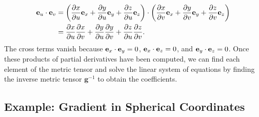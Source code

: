 \begin{align}
  \evec_u \cdot \evec_v &= \left( \dho{x}{u} \evec_x + \dho{y}{u} \evec_y + \dho{z}{u} \evec_z \right) \cdot \left( \dho{x}{v} \evec_x + \dho{y}{v} \evec_y + \dho{z}{v} \evec_z \right) \nonumber \\
  &= \dho{x}{u} \dho{x}{v} + \dho{y}{u} \dho{y}{v} + \dho{z}{u} \dho{z}{v} .
\end{align}
The cross terms vanish because $\evec_x \cdot \evec_y = 0$, $\evec_x \cdot \evec_z = 0$, and $\evec_y \cdot \evec_z = 0$. Once these products of partial derivatives have been computed, we can find each element of the metric tensor and solve the linear system of equations by finding the inverse metric tensor $\mathbf{g}^{-1}$ to obtain the coefficients.


\subsection{Example: Gradient in Spherical Coordinates}

